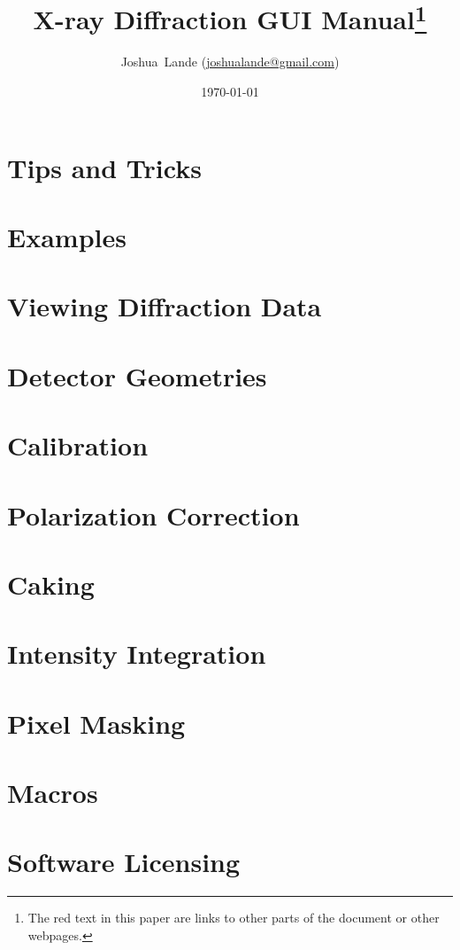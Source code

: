 \documentclass[12pt]{book}
\begin{document}
\title{X-ray Diffraction GUI Manual\footnote{The red text in this paper are links to other parts of the document or other webpages.}}
\date{\today}
\author{Joshua~Lande (\href{mailto:joshualande@gmail.com}{joshualande@gmail.com})}
\maketitle

\tableofcontents

\chapter{Tips and Tricks}


\chapter{Examples}


\chapter{Viewing Diffraction Data}
\label{viewing_data}

\chapter{Detector Geometries}


\chapter{Calibration}
\label{calibration}


\chapter{Polarization Correction}

\chapter{Caking}
\label{Caking}


\chapter{Intensity Integration}


\chapter{Pixel Masking}


\chapter{Macros}


\chapter{Software Licensing}



 

\printindex
\end{document}
